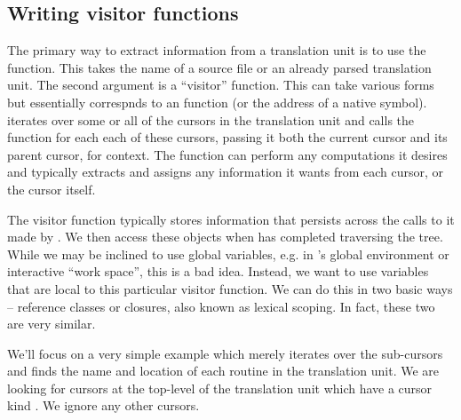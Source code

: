 \subsection{Writing visitor functions}


The primary way to extract information from a translation unit is to
use the  function.  This takes the name of a source
file or an already parsed translation unit.  The second argument is a
``visitor'' function.  This can take various forms but
essentially correspnds to an \R{} function (or the address of a native
symbol).  \libclang{} iterates over some or all of the cursors in the
translation unit and calls the \R{} function for each each of these
cursors, passing it both the current cursor and its parent cursor, for
context.  The function can perform any computations it desires and
typically extracts and assigns any information it wants from each cursor, or the
cursor itself.


The visitor function typically stores information that persists across
the calls to it made by \libclang.  We then access these objects when
\libclang{} has completed traversing the tree.  While we may be
inclined to use global variables, e.g. in \R{}'s global environment or
interactive ``work space'', this is a bad idea.  Instead, we want to
use variables that are local to this particular visitor function.  We
can do this in two basic ways -- reference classes or closures, also
known as lexical scoping.  In fact, these two are very similar.

We'll focus on a very simple example which merely
iterates over the sub-cursors and finds the name and location of each
routine in the translation unit.  We are looking for cursors at the
top-level of the translation unit which have a cursor kind
.  We ignore any other cursors.

